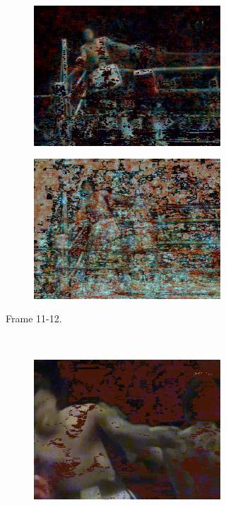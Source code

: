\documentclass[11pt,a4paper]{article}
\begin{document}
\def\wid{0.48}
\def\scal{0.55}
\begin{figure}
  \captionsetup[subfigure]{justification=centering}
  \centering
  \begin{subfigure}[]{\wid\textwidth}
    \begin{subfigure}[]{\wid\textwidth}
      \centering
      \includegraphics[keepaspectratio=true, scale=\scal]{Imgs/MuhammadAli/frame-11}
    \end{subfigure}
    
    \begin{subfigure}[]{\wid\textwidth}
      \centering
      \includegraphics[keepaspectratio=true, scale=\scal]{Imgs/MuhammadAli/frame-12}
    \end{subfigure}
    \caption{Frame 11-12.}
  \end{subfigure}
  ~
  \begin{subfigure}[]{\wid\textwidth}
    \begin{subfigure}[]{\wid\textwidth}
      \centering
      \includegraphics[keepaspectratio=true, scale=\scal]{Imgs/MuhammadAli/frame-208}
    \end{subfigure}
    

\end{subfigure}
\end{figure}
\end{document}
